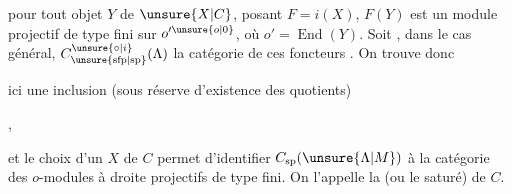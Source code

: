 
 pour tout objet $Y$ de $\unsure{X|C}$,  posant $F=i(X)$,
$F(Y)$ est un module  projectif de type fini sur
$o'^{\unsure{o|0}}$, où $o'=\operatorname{End}(Y)$. Soit , dans le cas général,
 $C^{\unsure{\circ|i}}_{\unsure{\mathrm{sfp}|\mathrm{sp}}}(\Lambda)$ la catégorie de ces foncteurs . On trouve donc


ici une inclusion (sous réserve d'existence des quotients)

,

et le choix d'un   $X$ de $C$ permet d'identifier $C_{\mathrm{sp}}(\unsure{\Lambda|M})$ à la catégorie des $o$-modules
à droite projectifs de type fini.  On l'appelle
la    (ou le saturé) de $C$.

